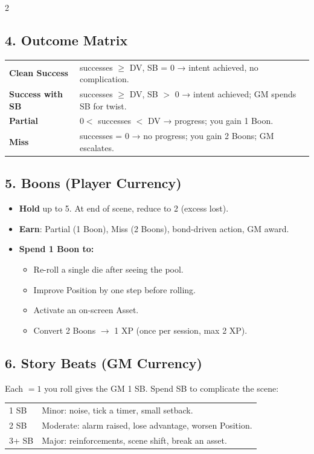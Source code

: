\documentclass[10pt,landscape]{article}
\begin{document}
\begin{multicols}{2}
\subsection*{4. Outcome Matrix}
\begin{tabularx}{\linewidth}{X X}
\textbf{Clean Success} & successes $\ge$ DV, SB = 0 → intent achieved, no complication. \\
\textbf{Success with SB} & successes $\ge$ DV, SB $>$ 0 → intent achieved; GM spends SB for twist. \\
\textbf{Partial} & $0 <$ successes $<$ DV → progress; you gain 1 Boon. \\
\textbf{Miss} & successes = 0 → no progress; you gain 2 Boons; GM escalates. \\
\end{tabularx}

\subsection*{5. Boons (Player Currency)}
\begin{itemize}
    \item \textbf{Hold} up to 5. At end of scene, reduce to 2 (excess lost).
    \item \textbf{Earn}: Partial (1 Boon), Miss (2 Boons), bond-driven action, GM award.
    \item \textbf{Spend 1 Boon to:}
    \begin{itemize}
        \item Re-roll a single die after seeing the pool.
        \item Improve Position by one step before rolling.
        \item Activate an on-screen Asset.
        \item Convert 2 Boons $\rightarrow$ 1 XP (once per session, max 2 XP).
    \end{itemize}
\end{itemize}

\subsection*{6. Story Beats (GM Currency)}
Each $=1$ you roll gives the GM 1 SB. Spend SB to complicate the scene:
\begin{tabularx}{\linewidth}{X X}
1 SB & Minor: noise, tick a timer, small setback. \\
2 SB & Moderate: alarm raised, lose advantage, worsen Position. \\
3+ SB & Major: reinforcements, scene shift, break an asset. \\
\end{tabularx}


\end{multicols}
\end{document}

